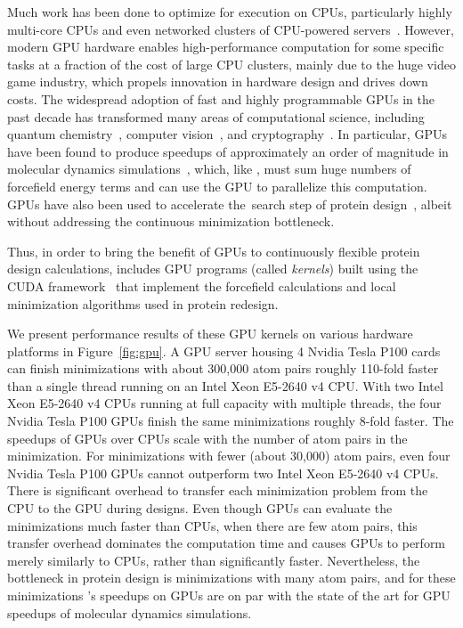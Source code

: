 Much work has been done to optimize \osprey for execution on CPUs, particularly highly multi-core CPUs and even networked clusters of CPU-powered servers~\cite{minBounds_DACS,cloud_OSPREY}. However, modern GPU hardware enables high-performance computation for some specific tasks at a fraction of the cost of large CPU clusters, mainly due to the huge video game industry, which propels innovation in hardware design and drives down costs. The widespread adoption of fast and highly programmable GPUs in the past decade has transformed many areas of computational science, including quantum chemistry~\cite{GPU_QM}, computer vision~\cite{ResNet}, and cryptography~\cite{GPU_crypto}.  In particular, GPUs have been found to produce speedups of approximately an order of magnitude in molecular dynamics simulations~\cite{HOOMD_GPU,AMBER_GPU_microseconds,GROMACS_GPU}, which, like \osprey, must sum huge numbers of forcefield energy terms and can use the GPU to parallelize this computation.  GPUs have also been used to accelerate the~\as search step of protein design~\cite{gosprey}, albeit without addressing the continuous minimization bottleneck.  

Thus, in order to bring the benefit of GPUs to continuously flexible protein design calculations,  includes GPU programs (called {\it kernels}) built using the CUDA framework~\cite{nvidia2010programming} that implement the forcefield calculations and local minimization algorithms used in protein redesign.

We present performance results of these GPU kernels on various hardware platforms in Figure~\ref{fig:gpu}. A GPU server housing 4 Nvidia Tesla P100 cards can finish minimizations with about 300,000 atom pairs roughly 110-fold faster than a single thread running on an Intel Xeon E5-2640 v4 CPU. With two Intel Xeon E5-2640 v4 CPUs running at full capacity with multiple threads, the four Nvidia Tesla P100 GPUs finish the same minimizations roughly 8-fold faster. The speedups of GPUs over CPUs scale with the number of atom pairs in the minimization. For minimizations with fewer (about 30,000) atom pairs, even four Nvidia Tesla P100 GPUs cannot outperform two Intel Xeon E5-2640 v4 CPUs. There is significant overhead to transfer each minimization problem from the CPU to the GPU during designs. Even though GPUs can evaluate the minimizations much faster than CPUs, when there are few atom pairs, this transfer overhead dominates the computation time and causes GPUs to perform merely similarly to CPUs, rather than significantly faster.  Nevertheless, the bottleneck in protein design is minimizations with many atom pairs, and for these minimizations \osprey's speedups on GPUs are on par with the state of the art for GPU speedups of molecular dynamics simulations.  

